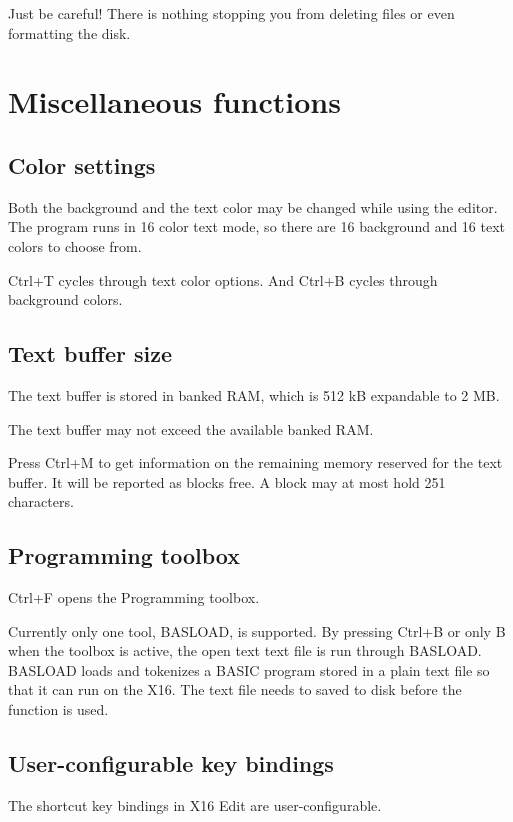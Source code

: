 \documentclass{article}
\begin{document}
        Just be careful! There is nothing stopping you from deleting files or even formatting the
        disk.

\section{Miscellaneous functions}

    \subsection{Color settings}
        Both the background and the text color may be changed while using the editor. 
        The program runs in 16 color text mode, so there are 16 background and 16 text colors to choose from.

        Ctrl+T cycles through text color options.
        And Ctrl+B cycles through background colors.

    \subsection{Text buffer size}
        The text buffer is stored in banked RAM, which is 512 kB expandable to 2 MB.

        The text buffer may not exceed the available banked RAM.

        Press Ctrl+M to get information on the remaining memory reserved for the
        text buffer. It will be reported as blocks free. A block may at most hold 251 characters.
    
    \subsection{Programming toolbox}
        Ctrl+F opens the Programming toolbox.

        Currently only one tool, BASLOAD, is supported. By pressing Ctrl+B or only B when
        the toolbox is active, the open text text file is run through BASLOAD. 
        BASLOAD loads and tokenizes a BASIC program stored in a plain text file so that it can run on the X16. 
        The text file needs to saved to disk before the function is used.

    \subsection{User-configurable key bindings}
        The shortcut key bindings in X16 Edit are user-configurable.
\end{document}
